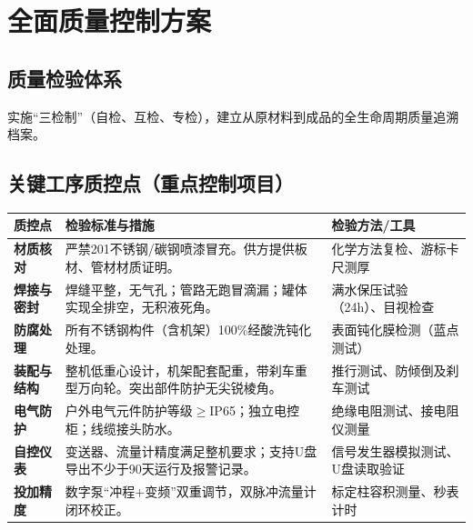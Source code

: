 \documentclass[UTF8,a4paper,12pt,titlepage]{ctexart}
\begin{document}
\section{全面质量控制方案}
    \subsection{质量检验体系}
    实施“三检制”（自检、互检、专检），建立从原材料到成品的全生命周期质量追溯档案。

    \subsection{关键工序质控点（重点控制项目）}
    \vspace{0.5cm}

    \begin{table}[htbp]
        \centering
        \renewcommand{\arraystretch}{1.5} %
        \begin{tabular}{>{\centering\arraybackslash}p{2.5cm} >{\raggedright\arraybackslash}p{7cm} >{\raggedright\arraybackslash}p{4.5cm}}
            \toprule
            \textbf{质控点} & \textbf{检验标准与措施} & \textbf{检验方法/工具} \\
            \midrule
            \textbf{材质核对} & 严禁201不锈钢/碳钢喷漆冒充。供方提供板材、管材材质证明。 & 化学方法复检、游标卡尺测厚 \\
            \midrule
            \textbf{焊接与密封} & 焊缝平整，无气孔；管路无跑冒滴漏；罐体实现全排空，无积液死角。 & 满水保压试验（24h）、目视检查 \\
            \midrule
            \textbf{防腐处理} & 所有不锈钢构件（含机架）100\%经酸洗钝化处理。 & 表面钝化膜检测（蓝点测试） \\
            \midrule
            \textbf{装配与结构} & 整机低重心设计，机架配套配重，带刹车重型万向轮。突出部件防护无尖锐棱角。 & 推行测试、防倾倒及刹车测试 \\
            \midrule
            \textbf{电气防护} & 户外电气元件防护等级\(\ge\)IP65；独立电控柜；线缆接头防水。 & 绝缘电阻测试、接电阻仪测量 \\
            \midrule
            \textbf{自控仪表} & 变送器、流量计精度满足整机要求；支持U盘导出不少于90天运行及报警记录。 & 信号发生器模拟测试、U盘读取验证 \\
            \midrule
            \textbf{投加精度} & 数字泵“冲程+变频”双重调节，双脉冲流量计闭环校正。 & 标定柱容积测量、秒表计时 \\
            \bottomrule
        \end{tabular}
    \end{table}
\end{document}

